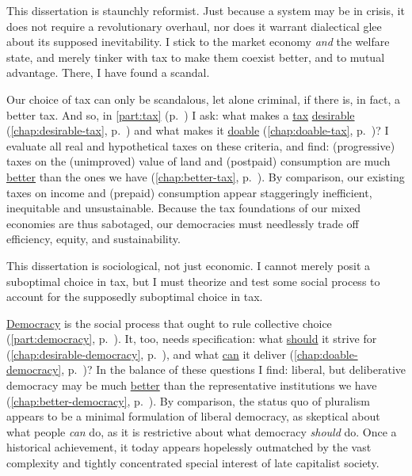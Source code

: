 This dissertation is staunchly reformist.
Just because a system may be in crisis, it does not require a revolutionary overhaul, nor does it warrant dialectical glee about its supposed inevitability.
I stick to the market economy \emph{and} the welfare state, and merely tinker with tax to make them coexist better, and to mutual advantage.
There, I have found a scandal.

Our choice of tax can only be scandalous, let alone criminal, if there is, in fact, a better tax.
And so, in \autoref{part:tax} (p.~\pageref{part:tax}) I ask:
what makes a \hyperref[part:tax]{tax} \hyperref[chap:desirable-tax]{desirable} (\autoref{chap:desirable-tax}, p.~\pageref{chap:desirable-tax}) and what makes it \hyperref[chap:doable-tax]{doable} (\autoref{chap:doable-tax}, p.~\pageref{chap:doable-tax})?
I evaluate all real and hypothetical taxes on these criteria, and find:
(progressive) taxes on the (unimproved) value of land and (postpaid) consumption are much \hyperref[chap:better-tax]{better} than the ones we have (\autoref{chap:better-tax}, p.~\pageref{chap:better-tax}).
By comparison, our existing taxes on income and (prepaid) consumption appear staggeringly inefficient, inequitable and unsustainable.
Because the tax foundations of our mixed economies are thus sabotaged, our democracies must needlessly trade off efficiency, equity, and sustainability.

This dissertation is sociological, not just economic.
I cannot merely posit a suboptimal choice in tax, but I must theorize and test some social process to account for the supposedly suboptimal choice in tax.

\hyperref[part:democracy]{Democracy} is the social process that ought to rule collective choice (\autoref{part:democracy}, p.~\pageref{part:democracy}).
It, too, needs specification:
what \hyperref[chap:desirable-democracy]{should} it strive for (\autoref{chap:desirable-democracy}, p.~\pageref{chap:desirable-democracy}), and what \hyperref[chap:doable-democracy]{can} it deliver (\autoref{chap:doable-democracy}, p.~\pageref{chap:doable-democracy})?
In the balance of these questions I find:
liberal, but deliberative democracy may be much \hyperref[chap:better-democracy]{better} than the representative institutions we have (\autoref{chap:better-democracy}, p.~\pageref{chap:better-democracy}).
By comparison, the status quo of pluralism appears to be a minimal formulation of liberal democracy, as skeptical about what people \emph{can} do, as it is restrictive about what democracy \emph{should} do.
Once a historical achievement, it today appears hopelessly outmatched by the vast complexity and tightly concentrated special interest of late capitalist society.

